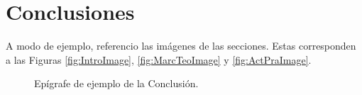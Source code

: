   \section{Conclusiones}

  A modo de ejemplo, referencio las imágenes de las secciones. Estas corresponden a las Figuras \ref{fig:IntroImage}, \ref{fig:MarcTeoImage} y \ref{fig:ActPraImage}.

   \begin{figure}[ht]
      \centering
      \caption{Epígrafe de ejemplo de la Conclusión.}
      \label{fig:ConclImage}
  \end{figure}

